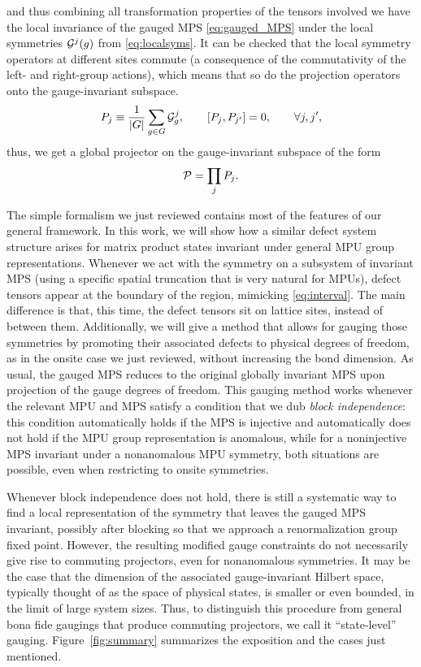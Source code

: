 \documentclass[reprint,
superscriptaddress,
amsmath,amssymb,
notitlepage,
aps,
prb,
10pt, 
tightenlines
]{revtex4-2}
\begin{document}
and thus combining all transformation properties of the tensors involved we have the local invariance of the gauged MPS \eqref{eq:gauged_MPS} under the local symmetries $\mathcal{G}^j(g)$ from \eqref{eq:localsyms}. It can be checked that the local symmetry operators at different sites commute (a consequence of the commutativity of the left- and right-group actions), which means that so do the projection operators onto the gauge-invariant subspace.
\begin{equation}
    P_j\equiv \dfrac{1}{|G|}\sum_{g\in G}{\mathcal{G}_g^j},\qquad [P_j, P_{j'}] = 0,\qquad \forall j, j',
\end{equation}
thus, we get a global projector on the gauge-invariant subspace of the form 
\begin{equation}
    \mathcal{P} = \prod_{j}{P_j}.
    \label{eq:projection}
\end{equation}

The simple formalism we just reviewed contains most of the features of our general framework. In this work, we will show how a similar defect system structure arises for matrix product states invariant under general MPU group representations. Whenever we act with the symmetry on a subsystem of invariant MPS (using a specific spatial truncation that is very natural for MPUs), defect tensors appear at the boundary of the region, mimicking \eqref{eq:interval}. The main difference is that, this time, the defect tensors sit on lattice sites, instead of between them. Additionally, we will give a method that allows for gauging those symmetries by promoting their associated defects to physical degrees of freedom, as in the onsite case we just reviewed, without increasing the bond dimension. As usual, the gauged MPS reduces to the original globally invariant MPS upon projection of the gauge degrees of freedom. This gauging method works whenever the relevant MPU and MPS satisfy a condition that we dub \textit{block independence}: this condition automatically holds if the MPS is injective and automatically does not hold if the MPU group representation is anomalous, while for a noninjective MPS invariant under a nonanomalous MPU symmetry, both situations are possible, even when restricting to onsite symmetries.

Whenever block independence does not hold, there is still a systematic way to find a local representation of the symmetry that leaves the gauged MPS invariant, possibly after blocking so that we approach a renormalization group fixed point. However, the resulting modified gauge constraints do not necessarily give rise to commuting projectors, even for nonanomalous symmetries. It may be the case that the dimension of the associated gauge-invariant Hilbert space, typically thought of as the space of physical states, is smaller or even bounded, in the limit of large system sizes. Thus, to distinguish this procedure from general bona fide gaugings that produce commuting projectors, we call it ``state-level'' gauging. Figure~\ref{fig:summary} summarizes the exposition and the cases just mentioned. 
\end{document}
